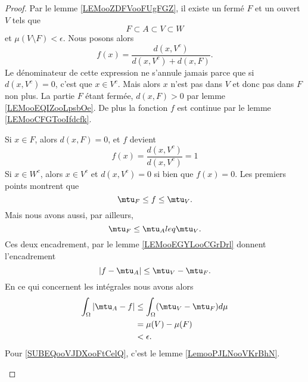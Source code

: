 \begin{proof}
	Par le lemme \ref{LEMooZDFVooFUgFGZ}, il existe un fermé \( F\) et un ouvert \( V\) tels que
	\begin{equation}
		F\subset A\subset V\subset W
	\end{equation}
	et \( \mu(V\setminus F)<\epsilon\). Nous posons alors
	\begin{equation}
		f(x)=\frac{ d(x,V^c) }{ d(x,V^c)+d(x,F) }.
	\end{equation}
	Le dénominateur de cette expression ne s'annule jamais parce que si \( d(x,V^c)=0\), c'est que \( x\in V^c\). Mais alors \( x\) n'est pas dans \( V\) et donc pas dans \( F\) non plus. La partie \( F\) étant fermée, \( d(x,F)>0\) par lemme \ref{LEMooEQIZooLpsbOe}. De plus la fonction \( f\) est continue par le lemme \ref{LEMooCFGTooIfdcfk}.

	\begin{subproof}
		Si \( x\in F\), alors \( d(x,F)=0\), et \( f\) devient
		\begin{equation}
			f(x)=\frac{ d(x,V^c) }{ d(x,V^c) }=1
		\end{equation}
		Si \( x\in W^c\), alors \( x\in V^c\) et \( d(x,V^c)=0\) si bien que \( f(x)=0\).
		Les premiers points montrent que
		\begin{equation}
			\mtu_F\leq f\leq \mtu_V.
		\end{equation}
		Mais nous avons aussi, par ailleurs,
		\begin{equation}
			\mtu_{F}\leq \mtu_Aleq \mtu_V.
		\end{equation}
		Ces deux encadrement, par le lemme \ref{LEMooEGYLooCGrDrl} donnent l'encadrement
		\begin{equation}
			| f-\mtu_A |\leq \mtu_V-\mtu_F.
		\end{equation}
		En ce qui concernent les intégrales nous avons alors
		\begin{subequations}
			\begin{align}
				\int_{\Omega}| \mtu_A-f | & \leq \int_{\Omega}(\mtu_V-\mtu_F)d\mu      \\
				                          & =\mu(V)-\mu(F) \label{SUBEQooVJDXooFtCelQ} \\
				                          & <\epsilon.
			\end{align}
		\end{subequations}
		Pour \eqref{SUBEQooVJDXooFtCelQ}, c'est le lemme \ref{LemooPJLNooVKrBhN}.
	\end{subproof}
\end{proof}

